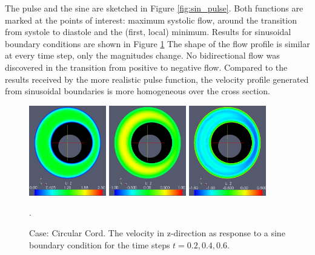 The pulse and the sine are sketched in Figure \ref{fig:sin_pulse}. Both functions are marked at the points of interest: maximum systolic flow, around the transition from systole to diastole and the (first, local) minimum. Results for sinusoidal boundary conditions are shown in Figure \ref{fig:case2} The shape of the flow profile is similar at every time step, only the magnitudes change. No bidirectional flow was discovered in the transition from positive to negative flow. Compared to the results received by the more realistic pulse function, the velocity profile generated from sinusoidal boundaries is more homogeneous over the cross section.




\begin{figure}\begin{center}
\includegraphics[width=0.3\textwidth]{chapters/hentschel/pdf/sin_sysmax_nmb2.pdf}
\includegraphics[width=0.3\textwidth]{chapters/hentschel/pdf/sin_sysdia_nmb4.pdf}
\includegraphics[width=0.3\textwidth]{chapters/hentschel/pdf/sin_diamin_nmb6.pdf}
\caption{Case: Circular Cord. The velocity in z-direction as response to a sine boundary condition for the time steps $t=0.2, 0.4, 0.6$.}
\label{fig:case2}.
\end{center}\end{figure}





